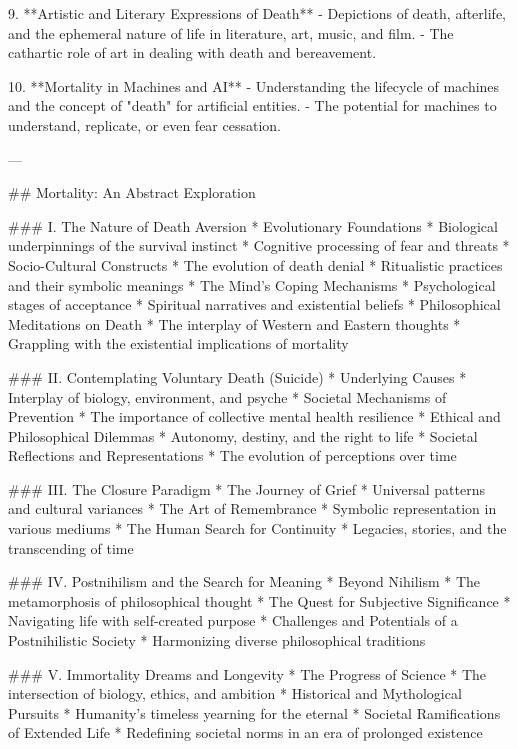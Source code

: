 9. **Artistic and Literary Expressions of Death**
   - Depictions of death, afterlife, and the ephemeral nature of life in literature, art, music, and film.
   - The cathartic role of art in dealing with death and bereavement.
   
10. **Mortality in Machines and AI**
   - Understanding the lifecycle of machines and the concept of "death" for artificial entities.
   - The potential for machines to understand, replicate, or even fear cessation.

---

## Mortality: An Abstract Exploration

### I. The Nature of Death Aversion
   * Evolutionary Foundations
      * Biological underpinnings of the survival instinct
      * Cognitive processing of fear and threats
   * Socio-Cultural Constructs
      * The evolution of death denial
      * Ritualistic practices and their symbolic meanings
   * The Mind's Coping Mechanisms
      * Psychological stages of acceptance
      * Spiritual narratives and existential beliefs
   * Philosophical Meditations on Death
      * The interplay of Western and Eastern thoughts
      * Grappling with the existential implications of mortality

### II. Contemplating Voluntary Death (Suicide)
   * Underlying Causes
      * Interplay of biology, environment, and psyche
   * Societal Mechanisms of Prevention
      * The importance of collective mental health resilience
   * Ethical and Philosophical Dilemmas
      * Autonomy, destiny, and the right to life
   * Societal Reflections and Representations
      * The evolution of perceptions over time

### III. The Closure Paradigm
   * The Journey of Grief
      * Universal patterns and cultural variances
   * The Art of Remembrance
      * Symbolic representation in various mediums
   * The Human Search for Continuity
      * Legacies, stories, and the transcending of time

### IV. Postnihilism and the Search for Meaning
   * Beyond Nihilism
      * The metamorphosis of philosophical thought
   * The Quest for Subjective Significance
      * Navigating life with self-created purpose
   * Challenges and Potentials of a Postnihilistic Society
      * Harmonizing diverse philosophical traditions

### V. Immortality Dreams and Longevity
   * The Progress of Science
      * The intersection of biology, ethics, and ambition
   * Historical and Mythological Pursuits
      * Humanity's timeless yearning for the eternal
   * Societal Ramifications of Extended Life
      * Redefining societal norms in an era of prolonged existence


